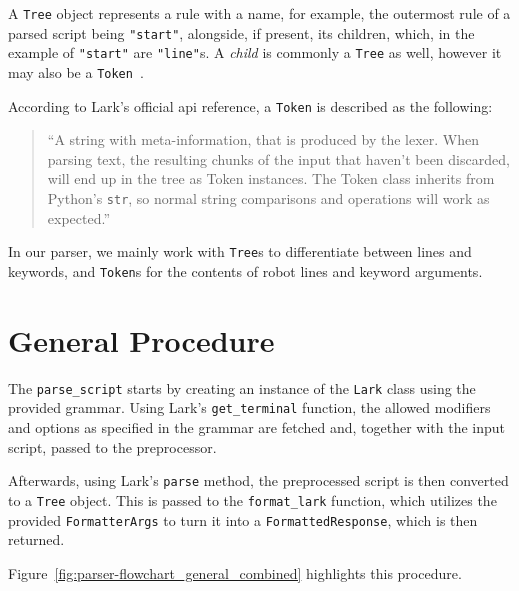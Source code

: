 A \verb|Tree| object represents a rule with a name, for example, the outermost rule of a parsed script being \verb|"start"|, alongside, if present, its children, which, in the example of \verb|"start"| are \verb|"line"|s. A \textit{child} is commonly a \verb|Tree| as well, however it may also be a \verb|Token|~\cite{py-module-lark-api}.

According to Lark's official \gls{api} reference, a \verb|Token| is described as the following:

\begin{quote}
``A string with meta-information, that is produced by the lexer. When parsing text, the resulting chunks of the input that haven't been discarded, will end up in the tree as Token instances. The Token class inherits from Python's \verb|str|, so normal string comparisons and operations will work as expected.''\cite{py-module-lark-api}
\end{quote}

In our parser, we mainly work with \verb|Tree|s to differentiate between lines and keywords, and \verb|Token|s for the contents of robot lines and keyword arguments. 

\section{General Procedure}

The \verb|parse_script| starts by creating an instance of the \verb|Lark| class using the provided grammar. Using Lark's \verb|get_terminal| function, the allowed modifiers and options as specified in the grammar are fetched and, together with the input script, passed to the preprocessor. 

Afterwards, using Lark's \verb|parse| method, the preprocessed script is then converted to a \verb|Tree| object. This is passed to the \verb|format_lark| function, which utilizes the provided \verb|FormatterArgs| to turn it into a \verb|FormattedResponse|, which is then returned. 

Figure~\ref{fig:parser-flowchart_general_combined} highlights this procedure.

